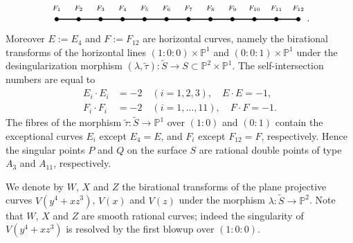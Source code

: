 \documentclass[12pt,reqno]{amsart}
\theoremstyle{definition}
\newcommand{\wt}{\widetilde}
\newcommand{\PP}{\mathbb{P}}
\newcommand{\lam}{\lambda}
\begin{document}
\[
\centering
\begin{tikzpicture}[line cap=round,line join=round,x=0.8cm,y=0.8cm]
\draw [line width=1.2pt] (-7.,0.)-- (4.,0.);
\begin{scriptsize}
\draw [fill=black] (-7,0) circle (2pt);
\draw[color=black] (-7,0.5) node {$F_{1}$};    
\draw [fill=black] (-6,0) circle (2pt);
\draw[color=black] (-6,0.5) node {$F_{2}$};
\draw [fill=black] (-5,0) circle (2pt);
\draw[color=black] (-5,0.5) node {$F_3$};
\draw [fill=black] (-4,0) circle (2pt);
\draw[color=black] (-4,0.5) node {$F_4$};
\draw [fill=black] (-3,0) circle (2pt);
\draw[color=black] (-3,0.5) node {$F_5$};
\draw [fill=black] (-2,0) circle (2pt);
\draw[color=black] (-2,0.5) node {$F_6$};
\draw [fill=black] (-1,0) circle (2pt);
\draw[color=black] (-1,0.5) node {$F_7$};
\draw [fill=black] (0,0) circle (2pt);
\draw[color=black] (0,0.5) node {$F_8$};
\draw [fill=black] (1,0) circle (2pt);
\draw[color=black] (1,0.5) node {$F_9$};
\draw [fill=black] (2,0) circle (2pt);
\draw[color=black] (2,0.5) node {$F_{10}$};
\draw [fill=black] (3,0) circle (2pt);
\draw[color=black] (3,0.5) node {$F_{11}$};
\draw [fill=black] (4,0) circle (2pt);
\draw[color=black] (4,0.5) node {$F_{12}$};
\end{scriptsize}
\end{tikzpicture}.
\]
Moreover $E:=E_4$ and $F:= F_{12}$ are horizontal curves, namely the birational transforms of the horizontal lines $(1:0:0) \times \PP^1$ and $(0:0:1) \times \PP^1$ under the desingularization morphism $(\lam,\wt \tau): \wt S \to S \subset \PP^2 \times \PP^1$.
The self-intersection numbers are equal to
\begin{align*}
    E_i \cdot E_i &= -2 \quad (i=1,2,3), \quad E \cdot E = -1, \\
    F_i \cdot F_i &= -2 \quad (i = 1,\dots,11), \quad F \cdot F = -1.
\end{align*}
The fibres of the morphism $\wt \tau: \wt S \to \PP^1$ over $(1:0)$ and $(0:1)$ contain the exceptional curves $E_i$ except $E_4 = E$, and $F_i$ except $F_{12}=F$, respectively.
Hence the singular points $P$ and $Q$ on the surface $S$ are rational double points of type $A_3$ and $A_{11}$, respectively.

We denote by $W$, $X$ and $Z$ the birational transforms of the plane projective curves $V(y^4 + xz^3)$, $V(x)$ and $V(z)$ under the morphism $\lam: \wt S \to \PP^2$.
Note that $W$, $X$ and $Z$ are smooth rational curves; indeed the singularity of $V(y^4 + xz^3)$ is resolved by the first blowup over $(1:0:0)$.
\end{document}

